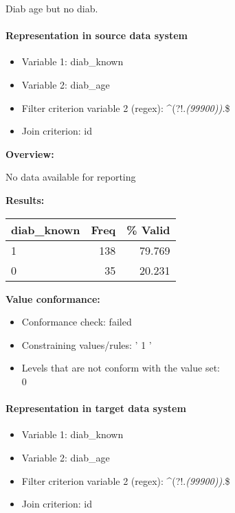 \documentclass[
]{article}
\providecommand{\tightlist}{%
  \setlength{\itemsep}{0pt}\setlength{\parskip}{0pt}}
\begin{document}
Diab age but no diab.

\hypertarget{representation-in-source-data-system-30}{%
\paragraph{Representation in source data
system}\label{representation-in-source-data-system-30}}

\begin{itemize}
\tightlist
\item
  Variable 1: diab\_known
\item
  Variable 2: diab\_age
\item
  Filter criterion variable 2 (regex):
  \^{}(?!.\emph{(99900)).}\$
\item
  Join criterion: id
\end{itemize}

\textbf{Overview:}

No data available for reporting

\textbf{Results:}\\

\begin{table}[H]
\centering
\begin{tabular}{l|r|r}
\hline
\textbf{diab\_known} & \textbf{Freq} & \textbf{\% Valid}\\
\hline
1 & 138 & 79.769\\
\hline
0 & 35 & 20.231\\
\hline
\end{tabular}
\end{table}

\textbf{Value conformance:}

\begin{itemize}
\tightlist
\item
  Conformance check: failed
\item
  Constraining values/rules: ' 1 '
\item
  Levels that are not conform with the value set:\\
  0
\end{itemize}

\hypertarget{representation-in-target-data-system-30}{%
\paragraph{Representation in target data
system}\label{representation-in-target-data-system-30}}

\begin{itemize}
\tightlist
\item
  Variable 1: diab\_known
\item
  Variable 2: diab\_age
\item
  Filter criterion variable 2 (regex):
  \^{}(?!.\emph{(99900)).}\$
\item
  Join criterion: id
\end{itemize}
\end{document}
